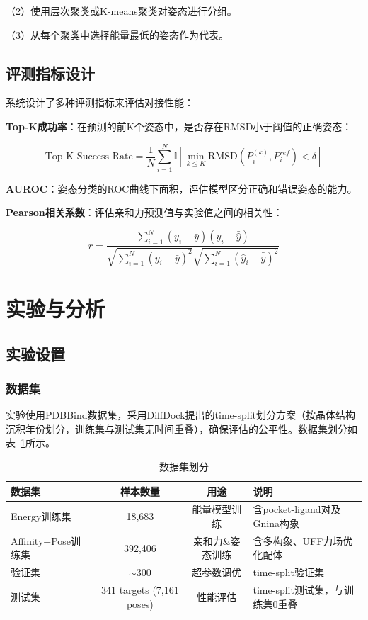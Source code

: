 （2）使用层次聚类或K-means聚类对姿态进行分组。

（3）从每个聚类中选择能量最低的姿态作为代表。

\subsection{评测指标设计}

系统设计了多种评测指标来评估对接性能：

\textbf{Top-K成功率}：在预测的前K个姿态中，是否存在RMSD小于阈值的正确姿态：

\begin{equation}
\text{Top-K Success Rate} = \frac{1}{N}\sum_{i=1}^{N}\mathbb{I}\left[\min_{k \leq K}\text{RMSD}(P_i^{(k)}, P_i^{ref}) < \delta\right]
\end{equation}

\textbf{AUROC}：姿态分类的ROC曲线下面积，评估模型区分正确和错误姿态的能力。

\textbf{Pearson相关系数}：评估亲和力预测值与实验值之间的相关性：

\begin{equation}
r = \frac{\sum_{i=1}^{N}(y_i - \bar{y})(\hat{y}_i - \bar{\hat{y}})}{\sqrt{\sum_{i=1}^{N}(y_i - \bar{y})^2}\sqrt{\sum_{i=1}^{N}(\hat{y}_i - \bar{\hat{y}})^2}}
\end{equation}

\newpage

\section{实验与分析}
\subsection{实验设置}

\subsubsection{数据集}

实验使用PDBBind数据集，采用DiffDock提出的time-split划分方案（按晶体结构沉积年份划分，训练集与测试集无时间重叠），确保评估的公平性。数据集划分如表~\ref{T.dataset}所示。

\begin{table}[htb]
  \centering
  \caption{数据集划分}
  \label{T.dataset}
  \begin{tabular}{lccp{5.5cm}}
  \hline
  数据集 & 样本数量 & 用途 & 说明 \\
  \hline
  Energy训练集 & 18,683 & 能量模型训练 & 含pocket-ligand对及Gnina构象 \\
  Affinity+Pose训练集 & 392,406 & 亲和力\&姿态训练 & 含多构象、UFF力场优化配体 \\
  验证集 & $\sim$300 & 超参数调优 & time-split验证集 \\
  测试集 & 341 targets (7,161 poses) & 性能评估 & time-split测试集，与训练集0重叠 \\
  \hline
\end{tabular}
\end{table}

